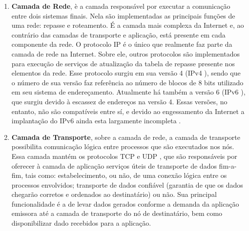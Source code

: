 \documentclass[	12pt, Times, openright, twoside, a4paper, english, brazil]{abntex2}
\begin{document}
\begin{enumerate}
\item \textbf{Camada de Rede}, è a camada responsável por executar a comunicação entre dois sistemas finais. Nela são implementadas as principais funções de uma rede: repasse e roteamento. É a camada mais complexa da Internet e, ao contrário das camadas de transporte e aplicação, está presente em cada componente da rede. O protocolo IP é o único que realmente faz parte da camada de rede na Internet. Sobre ele, outros protocolos são implementados para execução de serviços de atualização da tabela de repasse presente nos elementos da rede. Esse protocolo surgiu em sua versão 4 (IPv4 \cite{rfc791}), sendo que o número de sua versão faz referência ao número de blocos de 8 bits utilizado em seu sistema de endereçamento. Atualmente há também a versão 6 (IPv6 \cite{RFC2460}), que surgiu devido à escassez de endereços na versão 4. Essas versões, no entanto, não são compatíveis entre sí, e devido ao engessamento da Internet a implantação do IPv6 ainda esta largamente incompleta \cite{kreutz2015}.

\item \textbf{Camada de Transporte}, sobre a camada de rede, a camada de transporte possibilita comunicação lógica entre processos que são executados nos nós. Essa camada mantém os protocolos TCP \cite{rfc793} e UDP \cite{rfc768}, que são responsáveis por oferecer à camada de aplicação serviços úteis de transporte de dados fim-a-fim, tais como: estabelecimento, ou não, de uma conexão lógica entre os processos envolvidos; transporte de dados confiável (garantia de que os dados chegarão corretos e ordenados ao destinatário) ou não. Sua principal funcionalidade é a de levar dados gerados conforme a demanda da aplicação emissora até a camada de transporte do nó de destinatário, bem como disponibilizar dado recebidos para a aplicação. 


\end{enumerate}
\end{document}
